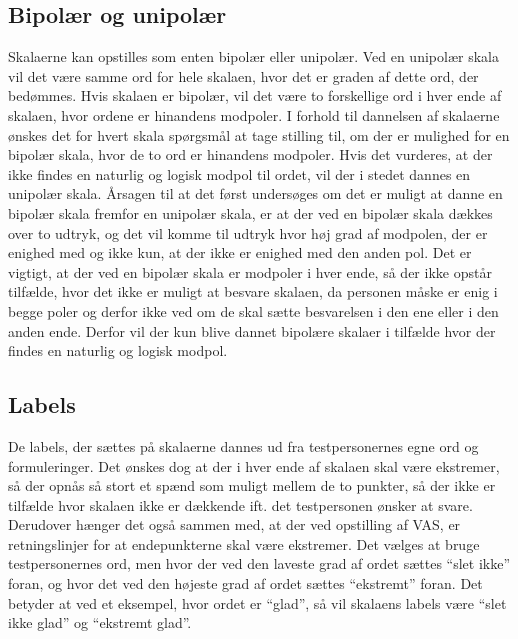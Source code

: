 \subsection{Bipolær og unipolær}
Skalaerne kan opstilles som enten bipolær eller unipolær. Ved en unipolær skala vil det være samme ord for hele skalaen, hvor det er graden af dette ord, der bedømmes. Hvis skalaen er bipolær, vil det være to forskellige ord i hver ende af skalaen, hvor ordene er hinandens modpoler. \blankline
%
I forhold til dannelsen af skalaerne ønskes det for hvert skala spørgsmål at tage stilling til, om der er mulighed for en bipolær skala, hvor de to ord er hinandens modpoler. Hvis det vurderes, at der ikke findes en naturlig og logisk modpol til ordet, vil der i stedet dannes en unipolær skala. \blankline
%
Årsagen til at det først undersøges om det er muligt at danne en bipolær skala fremfor en unipolær skala, er at der ved en bipolær skala dækkes over to udtryk, og det vil komme til udtryk hvor høj grad af modpolen, der er enighed med og ikke kun, at der ikke er enighed med den anden pol. Det er vigtigt, at der ved en bipolær skala er modpoler i hver ende, så der ikke opstår tilfælde, hvor det ikke er muligt at besvare skalaen, da personen måske er enig i begge poler og derfor ikke ved om de skal sætte besvarelsen i den ene eller i den anden ende. Derfor vil der kun blive dannet bipolære skalaer i tilfælde hvor der findes en naturlig og logisk modpol. 
%
\subsection{Labels}
%
De labels, der sættes på skalaerne dannes ud fra testpersonernes egne ord og formuleringer. 
Det ønskes dog at der i hver ende af skalaen skal være ekstremer, så der opnås så stort et spænd som muligt mellem de to punkter, så der ikke er tilfælde hvor skalaen ikke er dækkende ift. det testpersonen ønsker at svare. Derudover hænger det også sammen med, at der ved opstilling af VAS, er retningslinjer for at endepunkterne skal være ekstremer.\blankline
%
Det vælges at bruge testpersonernes ord, men hvor der ved den laveste grad af ordet sættes ``slet ikke'' foran, og hvor det ved den højeste grad af ordet sættes ``ekstremt'' foran. Det betyder at ved et eksempel, hvor ordet er ``glad'', så vil skalaens labels være ``slet ikke glad'' og ``ekstremt glad''. \blankline


